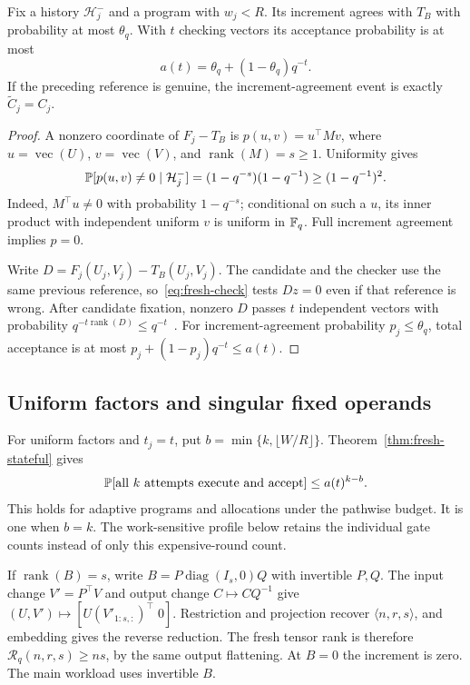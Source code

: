 \begin{theorem}\label{thm:fresh-one}
Fix a history $\mathcal H_j^-$ and a program with $w_j<R$. Its
increment agrees with $T_B$ with probability at most $\theta_q$.
With $t$ checking vectors its acceptance probability is at most
\begin{equation}\label{eq:fresh-w2}
a(t)=\theta_q+(1-\theta_q)q^{-t}.
\end{equation}
If the preceding reference is genuine, the increment-agreement event
is exactly $\widetilde C_j=C_j$.
\end{theorem}
\begin{proof}
A nonzero coordinate of $F_j-T_B$ is $p(u,v)=u^\top Mv$, where
$u=\operatorname{vec}(U)$, $v=\operatorname{vec}(V)$, and
$\operatorname{rank}(M)=s\ge1$. Uniformity gives
\begin{equation}\label{eq:fresh-nonzero}
\mathbb P[p(u,v)\ne0\mid\mathcal H_j^-]
=(1-q^{-s})(1-q^{-1})\ge(1-q^{-1})^2.
\end{equation}
Indeed, $M^\top u\ne0$ with probability $1-q^{-s}$; conditional
on such a $u$, its inner product with independent uniform $v$ is
uniform in $\mathbb F_q$. Full increment agreement implies $p=0$.

Write $D=F_j(U_j,V_j)-T_B(U_j,V_j)$. The candidate and the checker
use the same previous reference, so~\eqref{eq:fresh-check} tests $Dz=0$
even if that reference is wrong. After candidate fixation, nonzero $D$
passes $t$ independent vectors with probability
$q^{-t\operatorname{rank}(D)}\le q^{-t}$~\cite{freivalds}.
For increment-agreement probability $p_j\le\theta_q$, total
acceptance is at most $p_j+(1-p_j)q^{-t}\le a(t)$.
\end{proof}




\subsection{Uniform factors and singular fixed operands}
For uniform factors and $t_j=t$, put
$b=\min\{k,\lfloor W/R\rfloor\}$. Theorem~\ref{thm:fresh-stateful} gives
\begin{equation}\label{eq:fresh-w3-uniform}
\mathbb P[\text{all $k$ attempts execute and accept}]
\le a(t)^{k-b}.
\end{equation}
This holds for adaptive programs and allocations under the pathwise
budget. It is one when $b=k$. The work-sensitive profile below retains
the individual gate counts instead of only this expensive-round count.

If $\operatorname{rank}(B)=s$, write
$B=P\operatorname{diag}(I_s,0)Q$ with invertible $P,Q$. The input
change $V'=P^\top V$ and output change $C\mapsto CQ^{-1}$ give
$(U,V')\mapsto[U(V'_{1:s,:})^\top\;0]$.
Restriction and projection recover $\langle n,r,s\rangle$, and
embedding gives the reverse reduction. The fresh tensor rank is therefore
$\mathcal R_q(n,r,s)\ge ns$, by the same output flattening. At
$B=0$ the increment is zero. The main workload uses invertible $B$.
